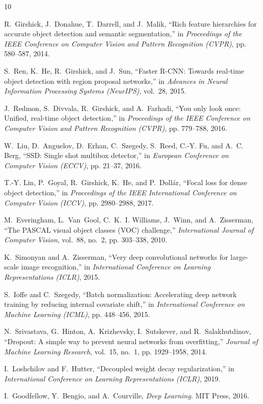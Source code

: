 \documentclass[11pt,a4paper]{article}
\begin{document}
\begin{thebibliography}{10}

R.~Girshick, J.~Donahue, T.~Darrell, and J.~Malik, ``Rich feature hierarchies
for accurate object detection and semantic segmentation,'' in \emph{Proceedings
of the IEEE Conference on Computer Vision and Pattern Recognition (CVPR)},
pp. 580--587, 2014.

S.~Ren, K.~He, R.~Girshick, and J.~Sun, ``Faster R-CNN: Towards real-time
object detection with region proposal networks,'' in \emph{Advances in Neural
Information Processing Systems (NeurIPS)}, vol.~28, 2015.

J.~Redmon, S.~Divvala, R.~Girshick, and A.~Farhadi, ``You only look once:
Unified, real-time object detection,'' in \emph{Proceedings of the IEEE
Conference on Computer Vision and Pattern Recognition (CVPR)}, pp. 779--788,
2016.

W.~Liu, D.~Anguelov, D.~Erhan, C.~Szegedy, S.~Reed, C.-Y. Fu, and A.~C. Berg,
``SSD: Single shot multibox detector,'' in \emph{European Conference on
Computer Vision (ECCV)}, pp. 21--37, 2016.

T.-Y. Lin, P.~Goyal, R.~Girshick, K.~He, and P.~Dollár, ``Focal loss for
dense object detection,'' in \emph{Proceedings of the IEEE International
Conference on Computer Vision (ICCV)}, pp. 2980--2988, 2017.

M.~Everingham, L.~Van~Gool, C.~K.~I. Williams, J.~Winn, and A.~Zisserman,
``The PASCAL visual object classes (VOC) challenge,'' \emph{International
Journal of Computer Vision}, vol.~88, no.~2, pp. 303--338, 2010.

K.~Simonyan and A.~Zisserman, ``Very deep convolutional networks for
large-scale image recognition,'' in \emph{International Conference on Learning
Representations (ICLR)}, 2015.

S.~Ioffe and C.~Szegedy, ``Batch normalization: Accelerating deep network
training by reducing internal covariate shift,'' in \emph{International
Conference on Machine Learning (ICML)}, pp. 448--456, 2015.

N.~Srivastava, G.~Hinton, A.~Krizhevsky, I.~Sutskever, and R.~Salakhutdinov,
``Dropout: A simple way to prevent neural networks from overfitting,''
\emph{Journal of Machine Learning Research}, vol.~15, no.~1, pp. 1929--1958,
2014.

I.~Loshchilov and F.~Hutter, ``Decoupled weight decay regularization,'' in
\emph{International Conference on Learning Representations (ICLR)}, 2019.

I.~Goodfellow, Y.~Bengio, and A.~Courville, \emph{Deep Learning}. MIT Press,
2016.

\end{thebibliography}
\end{document}

